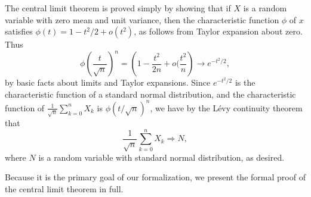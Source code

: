 \documentclass{article}
\theoremstyle{definition}
\begin{document}
The central limit theorem is proved simply by showing that if $X$ is a random variable with zero mean and unit variance, then the characteristic function $\phi$ of $x$ satisfies $\phi(t) = 1 - t^2/2 + o(t^2)$, as follows from Taylor expansion about zero. Thus
\[ \phi\left(\frac{t}{\sqrt n}\right)^n = \left(1 - \frac{t^2}{2n} + o(\frac{t^2}{n}\right) \rightarrow e^{-t^2/2}, \]
by basic facts about limits and Taylor expansions. Since $e^{-t^2/2}$ is the characteristic function of a standard normal distribution, and the characteristic function of $\frac{1}{\sqrt n} \sum_{k=0}^n X_k$ is $\phi(t/\sqrt n)^n$, we have by the L\'evy continuity theorem that
\[ \frac{1}{\sqrt n} \sum_{k=0}^n X_k \Rightarrow N, \]
where $N$ is a random variable with standard normal distribution, as desired.

Because it is the primary goal of our formalization, we present the formal proof of the central limit theorem in full.

\medskip
\end{document}
